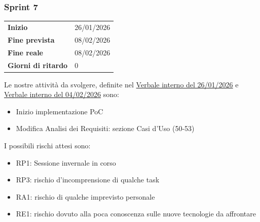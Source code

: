 \subsubsection{Sprint 7}


\begin{tabular}{p{} p{}}
	\textbf{Inizio} & 26/01/2026 \\
	\textbf{Fine prevista} & 08/02/2026 \\
	\textbf{Fine reale} &  08/02/2026\\
	\textbf{Giorni di ritardo} & 0
\end{tabular}
\newline \newline 
Le nostre attività da svolgere, definite nel \href{https://nullpointersgroup.github.io/Documentazione/output/RTB/Verbali%20Interni/2026-01-26_verbale_interno.pdf}{Verbale interno del 26/01/2026} e \href{https://nullpointersgroup.github.io/Documentazione/output/RTB/Verbali%20Interni/2026-02-04_verbale_interno.pdf}{Verbale interno del 04/02/2026} sono:
\begin{itemize}[itemsep=5pt, parsep=1pt, label=$\scriptstyle\bullet$]
    \item Inizio implementazione PoC
    \item Modifica Analisi dei Requisiti: sezione Casi d'Uso (50-53)
\end{itemize}

I possibili rischi attesi sono:
\begin{itemize}[itemsep=5pt, parsep=1pt, label=$\scriptstyle\bullet$]
	\item RP1: Sessione invernale in corso 
	\item RP3: rischio d'incomprensione di qualche task
	\item RA1: rischio di qualche imprevisto personale
	\item RE1: rischio dovuto alla poca conoscenza sulle nuove tecnologie da affrontare
\end{itemize}

